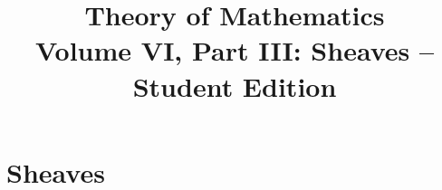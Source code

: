 \documentclass[11pt,a4paper,oneside,openany]{book}
\title{Theory of Mathematics\\[0.5em]\Large Volume VI, Part III: Sheaves -- Student Edition}
\author{}\date{}
\begin{document}
\maketitle\clearpage
\frontmatter\tableofcontents\mainmatter
\part{Sheaves}






\end{document}
